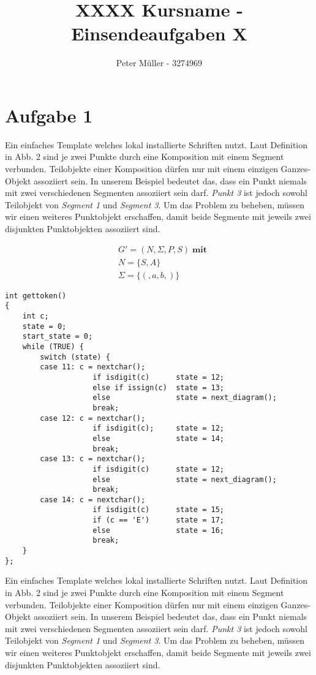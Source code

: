 \documentclass{article}
\title{XXXX Kursname - Einsendeaufgaben X}
\author{Peter Müller - 3274969}
\begin{document}
\setlength{\baselineskip}{1.5em}
\setlength{\parindent}{0em}
\setlength{\parskip}{1em}

\maketitle

\newpage

\section*{Aufgabe 1}

Ein einfaches Template welches lokal installierte Schriften nutzt. Laut Definition in Abb. 2 sind je zwei Punkte durch eine Komposition mit einem Segment verbunden. Teilobjekte einer Komposition dürfen nur mit einem einzigen Ganzes-Objekt assoziiert sein. In unserem Beispiel bedeutet das, dass ein Punkt niemals mit zwei verschiedenen Segmenten assoziiert sein darf. \textit{Punkt 3} ist jedoch sowohl Teilobjekt von \textit{Segment 1} und \textit{Segment 3}. Um das Problem zu beheben, müssen wir einen weiteres Punktobjekt erschaffen, damit beide Segmente mit jeweils zwei disjunkten Punktobjekten assoziiert sind.

\begin{align*}
  & G' = (N, \Sigma, P, S) \; \symbf{mit}\\
  & N = \{ S, A \} \\
  & \Sigma = \{ (, a, b, ) \}
\end{align*}

\linespread{1}
\begin{verbatim}
int gettoken()
{
    int c;
    state = 0;
    start_state = 0;
    while (TRUE) {
        switch (state) {
        case 11: c = nextchar();
                    if isdigit(c)      state = 12;
                    else if issign(c)  state = 13;
                    else               state = next_diagram();
                    break;
        case 12: c = nextchar();
                    if isdigit(c);     state = 12;
                    else               state = 14;
                    break;
        case 13: c = nextchar();
                    if isdigit(c)      state = 12;
                    else               state = next_diagram();
                    break;
        case 14: c = nextchar();
                    if isdigit(c)      state = 15;
                    if (c == 'E')      state = 17;
                    else               state = 16;
                    break;
    }
};
\end{verbatim}

Ein einfaches Template welches lokal installierte Schriften nutzt. Laut Definition in Abb. 2 sind je zwei Punkte durch eine Komposition mit einem Segment verbunden. Teilobjekte einer Komposition dürfen nur mit einem einzigen Ganzes-Objekt assoziiert sein. In unserem Beispiel bedeutet das, dass ein Punkt niemals mit zwei verschiedenen Segmenten assoziiert sein darf. \textit{Punkt 3} ist jedoch sowohl Teilobjekt von \textit{Segment 1} und \textit{Segment 3}. Um das Problem zu beheben, müssen wir einen weiteres Punktobjekt erschaffen, damit beide Segmente mit jeweils zwei disjunkten Punktobjekten assoziiert sind.
\end{document}
